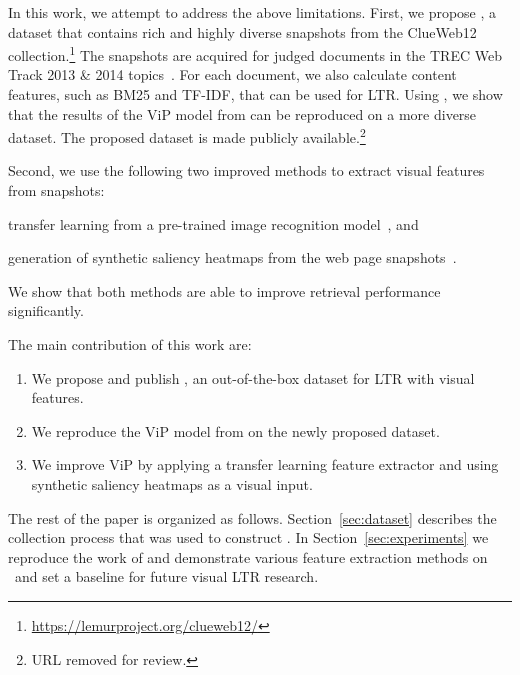 
In this work, we attempt to address the above limitations.
First, we propose \datasetname, a dataset that contains rich and highly diverse snapshots from the ClueWeb12 collection.\footnote{\url{https://lemurproject.org/clueweb12/}} The snapshots are acquired for judged documents in the TREC Web Track 2013 \& 2014 topics~\cite{collins2013trec,collins2015trec}. For each document, we also calculate content features, such as BM25 and TF-IDF, that can be used for \ac{LTR}.
%
Using \datasetname, we show that the results of the ViP model from \citet{fan2017learning} can be reproduced on a more diverse dataset.
The proposed dataset is made publicly available.\footnote{URL removed for review.}

Second, we use the following two improved methods to extract visual features from snapshots:
\begin{inparaenum}[(i)]
\item transfer learning from a pre-trained image recognition model~\cite{donahue2014decaf,simonyan2014very}, and
\item generation of synthetic saliency heatmaps from the web page snapshots~\cite{shen2014webpage,shan2017two}.
\end{inparaenum}
We show that both methods are able to improve retrieval performance significantly.

The main contribution of this work are:
\begin{enumerate}  
\item We propose and publish \datasetname, an out-of-the-box dataset for \ac{LTR} with visual features.
\item We reproduce the ViP model from \cite{fan2017learning} on the newly proposed dataset.
\item We improve ViP by applying a transfer learning feature extractor and using synthetic saliency heatmaps as a visual input.
\end{enumerate}

 The rest of the paper is organized as follows. Section~\ref{sec:dataset} describes the collection process that was used to construct \datasetname. In Section~\ref{sec:experiments} we reproduce the work of \citet{fan2017learning} and demonstrate various feature extraction methods on \datasetname~and set a baseline for future visual \ac{LTR} research.  